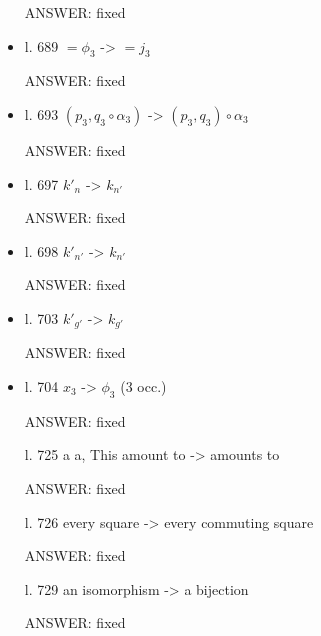 \documentclass[english,11pt,a4paper]{article}
\begin{document}
\begin{itemize}
ANSWER: fixed


\item l. 689 $= \phi_3$ -> $= j_3$

ANSWER: fixed

\item l. 693 $(p_3, q_3 \circ \alpha_3)$ -> $(p_3, q_3) \circ \alpha_3$

ANSWER: fixed

\item l. 697 $ k'_n$ -> $k_{n'}$

ANSWER: fixed

\item l. 698 $k'_{n'}$ -> $k_{n'}$

ANSWER: fixed

\item l. 703 $k'_{g'}$ -> $k_{g'}$

ANSWER: fixed

\item l. 704 $x_3$ -> $\phi_3$ (3 occ.)

ANSWER: fixed

l. 725 a a, This amount to -> amounts to

ANSWER: fixed

l. 726 every square -> every commuting square

ANSWER: fixed

l. 729 an isomorphism -> a bijection

ANSWER: fixed
\end{itemize} 

	
	
\end{document}
